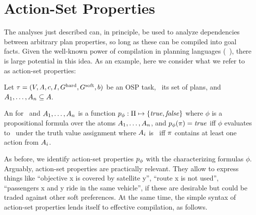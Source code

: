 \section{Action-Set Properties}
\label{actionsetprops}



The analyses just described can, in principle, be used to analyze
dependencies between arbitrary plan properties, so long as these can
be compiled into goal facts. Given the well-known power of compilation
in planning languages
(\eg\ \cite{gazen:knoblock:ecp-97,nebel:jair-00,edelkamp:icaps-06,palacios:geffner:jair-09,baier:etal:ai-09}),
there is large potential in this idea. As an example, here we consider
what we refer to as action-set properties:

%
\begin{definition}\label{def:action-set-properties}
Let $\tau =
(V,\allowbreak A,\allowbreak{\ensuremath{c}},\allowbreak I,\allowbreak G^{\text{\textup{hard}}},\allowbreak G^{\text{\textup{soft}}},\allowbreak{\ensuremath{b}})$
be an OSP task, \plans\ its set of plans, and $A_1, \dots, A_n
\subseteq A$.

An  for \task\ and $A_1, \dots,
A_n$ is a function $p_\phi : \Pi \mapsto \{\mathit{true}, \mathit{false}\}$
where $\phi$ is a propositional formula over the atoms $A_1,
\dots, A_n$, and $p_\phi(\pi) = \mathit{true}$ iff $\phi$ evaluates
to \true\ under the truth value assignment where $A_i$ is
\true\ iff $\pi$ contains at least one action from $A_i$.
\end{definition}

As before, we identify action-set properties $p_\phi$ with the
characterizing formulas $\phi$. Arguably, action-set properties are
practically relevant. They allow to express things like ``objective x
is covered by satellite y'', %
%
``route x is not used'',
%
``passengers x and y ride in the same vehicle'',
%
if these are desirable but could be traded against other soft
preferences. At the same time, the simple syntax of action-set
properties lends itself to effective compilation, as follows.

